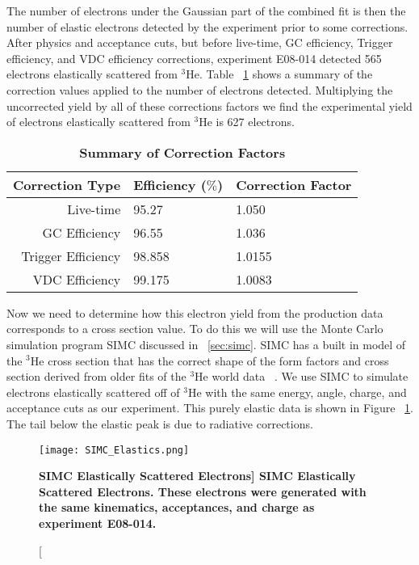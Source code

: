 The number of electrons under the Gaussian part of the combined fit is then the number of elastic electrons detected by the experiment prior to some corrections. After physics and acceptance cuts, but before live-time, GC efficiency, Trigger efficiency, and VDC efficiency corrections, experiment E08-014 detected 565 electrons elastically scattered from $^3$He. Table ~\ref{tab:corrections} shows a summary of the correction values applied to the number of electrons detected. Multiplying the uncorrected yield by all of these corrections factors we find the experimental yield of electrons elastically scattered from  $^3$He is 627 electrons.

\vspace{5mm}

\begin{table}[!h]
\centering
\begin{tabular}{|r | l l|}
\hline
\textbf{Correction Type} & \textbf{Efficiency ($\%$)} & \textbf{Correction Factor}\\
\hline
Live-time & 95.27 & 1.050 \\ 
GC Efficiency & 96.55 & 1.036 \\ 
Trigger Efficiency & 98.858 & 1.0155 \\ 
VDC Efficiency & 99.175 &  1.0083\\ 
\hline
\end{tabular}
\caption{{\bf{Summary of Correction Factors}} }
\label{tab:corrections}
\end{table}

Now we need to determine how this electron yield from the production data corresponds to a cross section value. To do this we will use the Monte Carlo simulation program SIMC discussed in ~\ref{sec:simc}. SIMC has a built in model of the $^3$He cross section that has the correct shape of the form factors and cross section derived from older fits of the $^3$He world data ~\cite{Article:Amroun}. We use SIMC to simulate electrons elastically scattered off of $^3$He with the same energy, angle, charge, and acceptance cuts as our experiment. This purely elastic data is shown in Figure ~\ref{fig:simc_elastics}. The tail below the elastic peak is due to radiative corrections.

\begin{figure}[!ht]
\begin{center}
\texttt{[image: SIMC\_Elastics.png]}
\end{center}
\caption[\bf{SIMC Elastically Scattered Electrons}]{
{\bf{SIMC Elastically Scattered Electrons.}} These electrons were generated with the same kinematics, acceptances, and charge as experiment E08-014.}
\label{fig:simc_elastics}
\end{figure}

